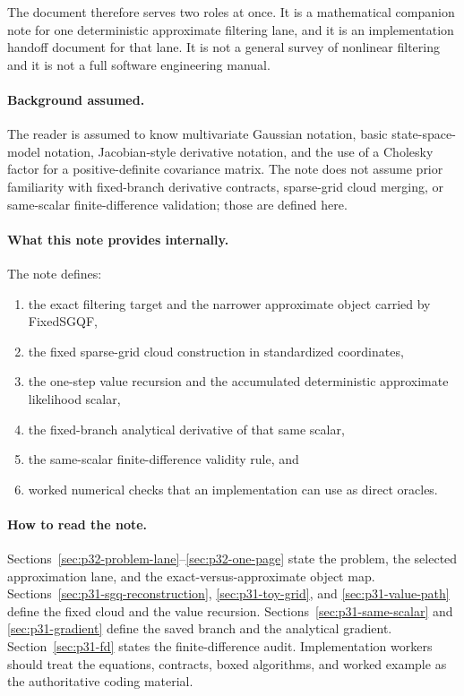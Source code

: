 \documentclass[11pt]{article}
\numberwithin{equation}{section}
\begin{document}
The document therefore serves two roles at once.  It is a mathematical
companion note for one deterministic approximate filtering lane, and it is an
implementation handoff document for that lane.  It is not a general survey of
nonlinear filtering and it is not a full software engineering manual.

\paragraph{Background assumed.}
The reader is assumed to know multivariate Gaussian notation, basic
state-space-model notation, Jacobian-style derivative notation, and the use of a
Cholesky factor for a positive-definite covariance matrix.  The note does not
assume prior familiarity with fixed-branch derivative contracts, sparse-grid
cloud merging, or same-scalar finite-difference validation; those are defined
here.

\paragraph{What this note provides internally.}
The note defines:
\begin{enumerate}[leftmargin=0.28in]
  \item the exact filtering target and the narrower approximate object carried by
  FixedSGQF,
  \item the fixed sparse-grid cloud construction in standardized coordinates,
  \item the one-step value recursion and the accumulated deterministic
  approximate likelihood scalar,
  \item the fixed-branch analytical derivative of that same scalar,
  \item the same-scalar finite-difference validity rule, and
  \item worked numerical checks that an implementation can use as direct
  oracles.
\end{enumerate}

\paragraph{How to read the note.}
Sections~\ref{sec:p32-problem-lane}--\ref{sec:p32-one-page} state the problem,
the selected approximation lane, and the exact-versus-approximate object map.
Sections~\ref{sec:p31-sgq-reconstruction}, \ref{sec:p31-toy-grid}, and
\ref{sec:p31-value-path} define the fixed cloud and the value recursion.
Sections~\ref{sec:p31-same-scalar} and \ref{sec:p31-gradient} define the saved
branch and the analytical gradient.  Section~\ref{sec:p31-fd} states the
finite-difference audit.  Implementation workers should treat the equations,
contracts, boxed algorithms, and worked example as the authoritative coding
material.
\end{document}
